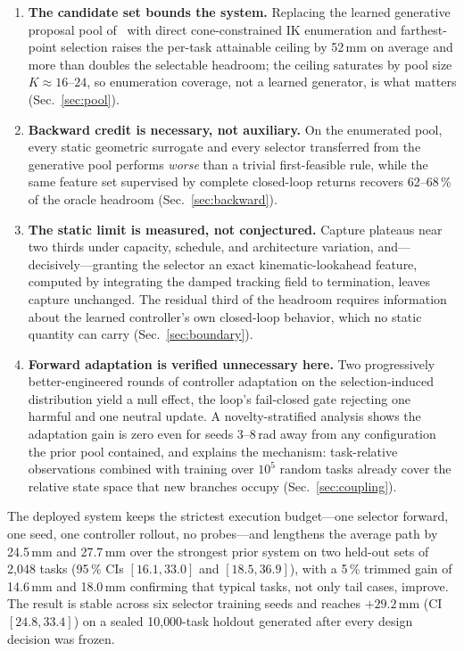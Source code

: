 \documentclass{svproc}
\begin{document}
\begin{enumerate}
\item \textbf{The candidate set bounds the system.} Replacing the learned
generative proposal pool of~\cite{yuan2026extreme} with direct
cone-constrained IK enumeration and farthest-point selection raises the
per-task attainable ceiling by 52\,mm on average and more than doubles the
selectable headroom; the ceiling saturates by pool size $K{\approx}16$--$24$,
so enumeration coverage, not a learned generator, is what matters
(Sec.~\ref{sec:pool}).
\item \textbf{Backward credit is necessary, not auxiliary.} On the enumerated
pool, every static geometric surrogate and every selector transferred from the
generative pool performs \textit{worse} than a trivial first-feasible rule,
while the same feature set supervised by complete closed-loop returns recovers
62--68\,\% of the oracle headroom (Sec.~\ref{sec:backward}).
\item \textbf{The static limit is measured, not conjectured.} Capture
plateaus near two thirds under capacity, schedule, and architecture variation,
and---decisively---granting the selector an exact kinematic-lookahead feature,
computed by integrating the damped tracking field to termination, leaves
capture unchanged. The residual third of the headroom requires information
about the learned controller's own closed-loop behavior, which no static
quantity can carry (Sec.~\ref{sec:boundary}).
\item \textbf{Forward adaptation is verified unnecessary here.} Two
progressively better-engineered rounds of controller adaptation on the
selection-induced distribution yield a null effect, the loop's fail-closed
gate rejecting one harmful and one neutral update. A novelty-stratified
analysis shows the adaptation gain is zero even for seeds 3--8\,rad away from
any configuration the prior pool contained, and explains the mechanism:
task-relative observations combined with training over $10^{5}$ random tasks
already cover the relative state space that new branches occupy
(Sec.~\ref{sec:coupling}).
\end{enumerate}

The deployed system keeps the strictest execution budget---one selector
forward, one seed, one controller rollout, no probes---and lengthens the
average path by 24.5\,mm and 27.7\,mm over the strongest prior system on two
held-out sets of 2{,}048 tasks (95\,\% CIs $[16.1,33.0]$ and $[18.5,36.9]$),
with a 5\,\% trimmed gain of 14.6\,mm and 18.0\,mm confirming that typical
tasks, not only tail cases, improve. The result is stable across six selector
training seeds and reaches $+29.2$\,mm (CI $[24.8,33.4]$) on a sealed
10{,}000-task holdout generated after every design decision was frozen.
\end{document}
